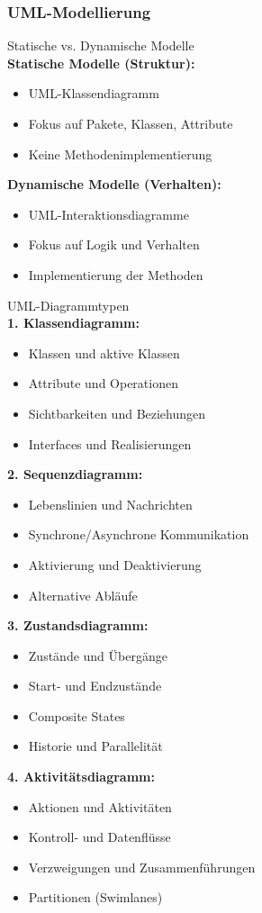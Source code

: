 \subsubsection{UML-Modellierung}

\begin{KR}{Statische vs. Dynamische Modelle}\\
\textbf{Statische Modelle (Struktur):}
\begin{itemize}
    \item UML-Klassendiagramm
    \item Fokus auf Pakete, Klassen, Attribute
    \item Keine Methodenimplementierung
\end{itemize}

\textbf{Dynamische Modelle (Verhalten):}
\begin{itemize}
    \item UML-Interaktionsdiagramme
    \item Fokus auf Logik und Verhalten
    \item Implementierung der Methoden
\end{itemize}
\end{KR}

\begin{definition}{UML-Diagrammtypen}\\
\textbf{1. Klassendiagramm:}
\begin{itemize}
    \item Klassen und aktive Klassen
    \item Attribute und Operationen
    \item Sichtbarkeiten und Beziehungen
    \item Interfaces und Realisierungen
\end{itemize}

\textbf{2. Sequenzdiagramm:}
\begin{itemize}
    \item Lebenslinien und Nachrichten
    \item Synchrone/Asynchrone Kommunikation
    \item Aktivierung und Deaktivierung
    \item Alternative Abläufe
\end{itemize}

\textbf{3. Zustandsdiagramm:}
\begin{itemize}
    \item Zustände und Übergänge
    \item Start- und Endzustände
    \item Composite States
    \item Historie und Parallelität
\end{itemize}

\textbf{4. Aktivitätsdiagramm:}
\begin{itemize}
    \item Aktionen und Aktivitäten
    \item Kontroll- und Datenflüsse
    \item Verzweigungen und Zusammenführungen
    \item Partitionen (Swimlanes)
\end{itemize}
\end{definition}

